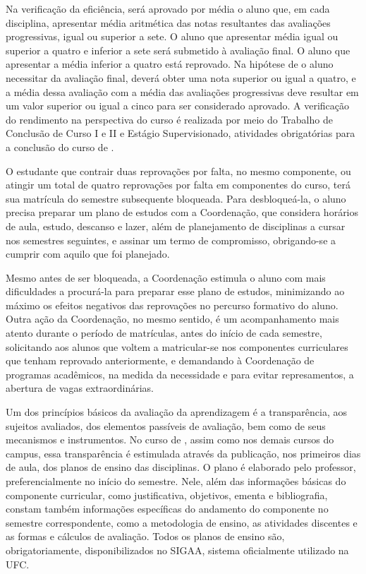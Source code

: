Na verificação da eficiência, será aprovado por média o aluno que, em cada disciplina, apresentar média aritmética das notas resultantes das avaliações progressivas, igual ou superior a sete. O aluno que apresentar média igual ou superior a quatro e inferior a sete será submetido à avaliação final. O aluno que apresentar a média inferior a quatro está reprovado. Na hipótese de o aluno necessitar da avaliação final, deverá obter uma nota superior ou igual a quatro, e a média dessa avaliação com a média das avaliações progressivas deve resultar em um valor superior ou igual a cinco para ser considerado aprovado. A verificação do rendimento na perspectiva do curso é realizada por meio do Trabalho de Conclusão de Curso I e II e Estágio Supervisionado, atividades obrigatórias para a conclusão do curso de \nomedocurso.

O estudante que contrair duas reprovações por falta, no mesmo componente, ou atingir um total de quatro reprovações por falta em componentes do curso, terá sua matrícula do semestre subsequente bloqueada. Para desbloqueá-la, o aluno precisa preparar um plano de estudos com a Coordenação, que considera horários de aula, estudo, descanso e lazer, além de planejamento de disciplinas a cursar nos semestres seguintes, e assinar um termo de compromisso, obrigando-se a cumprir com aquilo que foi planejado.

Mesmo antes de ser bloqueada, a Coordenação estimula o aluno com mais dificuldades a procurá-la para preparar esse plano de estudos, minimizando ao máximo os efeitos negativos das reprovações no percurso formativo do aluno. Outra ação da Coordenação, no mesmo sentido, é um acompanhamento mais atento durante o período de matrículas, antes do início de cada semestre, solicitando aos alunos que voltem a matricular-se nos componentes curriculares que tenham reprovado anteriormente, e demandando à Coordenação de programas acadêmicos, na medida da necessidade e para evitar represamentos, a abertura de vagas extraordinárias.

Um dos princípios básicos da avaliação da aprendizagem é a transparência, aos sujeitos avaliados, dos elementos passíveis de avaliação, bem como de seus mecanismos e instrumentos. No curso de \nomedocurso, assim como nos demais cursos do campus, essa transparência é estimulada através da publicação, nos primeiros dias de aula, dos planos de ensino das disciplinas. O plano é elaborado pelo professor, preferencialmente no início do semestre. Nele, além das informações básicas do componente curricular, como justificativa, objetivos, ementa e bibliografia, constam também informações específicas do andamento do componente no semestre correspondente, como a metodologia de ensino, as atividades discentes e as formas e cálculos de avaliação. Todos os planos de ensino são, obrigatoriamente, disponibilizados no SIGAA, sistema oficialmente utilizado na UFC.

